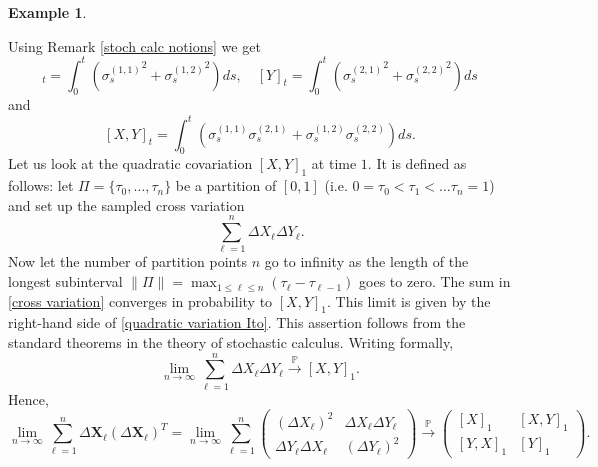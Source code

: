 \documentclass[a4paper,11pt]{article}
\theoremstyle{plain}
\theoremstyle{definition}
\newtheorem{exmp}[thm]{Example}
\begin{document}
\begin{exmp}
\begin{enumerate}
			Using Remark \ref{stoch calc notions} we get
			\begin{equation}
			[X]_t = \int_{0}^{t}({\sigma^{(1,1)}_s}^2 + {\sigma^{(1,2)}_s}^2) ds, \quad  [Y]_t = \int_{0}^{t}({\sigma^{(2,1)}_s}^2 + {\sigma^{(2,2)}_s}^2) ds
			\end{equation}
			and
			\begin{equation} \label{quadratic variation Ito}
			[X, Y]_t = \int_{0}^{t}({\sigma^{(1,1)}_s}{\sigma^{(2,1)}_s} + {\sigma^{(1,2)}_s}{\sigma^{(2,2)}_s}) ds. 
			\end{equation}
			Let us look at the quadratic covariation $[X, Y]_1$ at time $1$. It is defined as follows: let $\Pi = \{ \tau_0, \dots, \tau_n \}$ be a partition of $[0, 1]$ (i.e. $0 = \tau_0 < \tau_1 < \dots \tau_n = 1$) and set up the sampled cross variation
			\begin{equation} \label{cross variation}
			\sum_{\ell = 1}^{n} \Delta X_\ell \Delta Y_\ell.
			\end{equation}
			Now let the number of partition points $n$ go to infinity as the length of the longest subinterval $\| \Pi \| = \max_{1 \leq \ell \leq n}(\tau_{\ell} - \tau_{\ell-1}) $ goes to zero. The sum in \eqref{cross variation} converges in probability to $[X, Y]_1$. This limit is given by the right-hand side of \eqref{quadratic variation Ito}. This assertion follows from the standard theorems in the theory of stochastic calculus. Writing formally,
			\[  \lim_{n \rightarrow \infty} \sum_{\ell = 1}^{n} \Delta X_\ell \Delta Y_\ell \xrightarrow{\mathbb{P}} [X, Y]_1. \]
			Hence,
			\[
			\lim_{n \rightarrow \infty} \sum_{\ell=1}^{n}\Delta \mathbf{X}_\ell(\Delta \mathbf{X}_\ell)^T
			= \lim_{n \rightarrow \infty} \sum_{\ell=1}^{n}\begin{pmatrix}
			(\Delta X_\ell)^2 & \Delta X_\ell \Delta Y_\ell \\
			\Delta Y_\ell \Delta X_\ell & (\Delta Y_\ell)^2
			\end{pmatrix} 
			\xrightarrow{\mathbb{P}} 
			\begin{pmatrix}
			[X]_1 & [X, Y]_1 \\
			[Y, X]_1 & [Y]_1
			\end{pmatrix}.
			\]
			

\end{enumerate}
\end{exmp}
\end{document}
